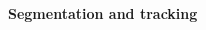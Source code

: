 \documentclass[final,svgnames,dvipsnames,table]{beamer}
\begin{document}
\begin{frame}[fragile]
\begin{columns}[t,totalwidth=\textwidth]
\begin{column}{0.32\textwidth}
\begin{block}{\bf Segmentation and tracking}
    \end{block}
    \end{column}
    \begin{column}{0.32\textwidth}
%
%
%          
%
%          
%          
%
%          



\end{column}
\end{columns}
\end{frame}
\end{document}
